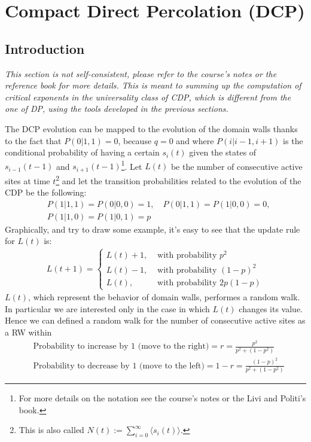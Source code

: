 \documentclass[4apaper,11pt,fleqn]{article}
\theoremstyle{remark}
\theoremstyle{definition}
\begin{document}
\section{Compact Direct Percolation (DCP)}

\subsection{Introduction}
\emph{This section is not self-consistent, please refer to the course's notes or the reference book for more details. This is meant to summing up the computation of critical exponents in the universality class of CDP, which is different from the one of DP, using the tools developed in the previous sections.}

The DCP evolution can be mapped to the evolution of the domain walls thanks to the fact that $P(0|1,1)=0$, because $q=0$ and where $P(i|i-1,i+1)$ is the conditional probability of having a certain $s_i(t)$ given the states of $s_{i-1}(t-1)$ and $s_{i+1}(t-1)$\;\footnote{For more details on the notation see the course's notes or the Livi and Politi's book.}. Let $L(t)$ be the number of consecutive active sites at time $t$\;\footnote{This is also called $N(t) := \sum_{i=0}^{\infty} \langle s_i(t) \rangle$.} and let the transition probabilities related to the evolution of the CDP be the following:
\begin{align*}
  &P(1|1,1) = P(0|0,0) = 1, \quad P(0|1,1) = P(1|0,0) = 0, \\
  &P(1|1,0) = P(1|0,1) = p
\end{align*}
Graphically, and try to draw some example, it's easy to see that the update rule for $L(t)$ is:
\begin{align}
  L(t+1)=\left\{\begin{array}{cl}{L(t)+1,} & {\text { with probability } p^{2}} \\ {L(t)-1,} & {\text { with probability }(1-p)^{2}} \\ {L(t),} & {\text { with probability } 2 p(1-p)}\end{array}\right.
\end{align}
$L(t)$, which represent the behavior of domain walls, performes a random walk. In particular we are interested only in the case in which $L(t)$ changes its value. Hence we can defined a random walk for the number of consecutive active sites as a RW within
\begin{align*}
  &\text{Probability to increase by 1 (move to the right)} = r = \frac{p^2}{p^2+(1-p^2)} \\
  &\text{Probability to decrease by 1 (move to the left)}  = 1-r = \frac{(1-p)^2}{p^2+(1-p^2)}
\end{align*}
\end{document}
